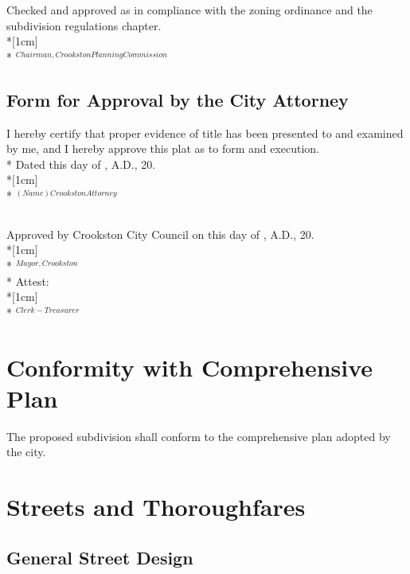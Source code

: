 \subsubsection{}
Checked and approved as in compliance with the zoning ordinance and the subdivision regulations chapter.\\*[1cm]
\fillable{5cm}\\*
$^{Chairman, Crookston Planning Commission}$
\subsection{Form for Approval by the City Attorney}
I hereby certify that proper evidence of title has been presented to and examined by me, and I hereby approve this plat as to form and execution.\\*
Dated this \fillable{1cm} day of \fillable{2cm}, A.D., 20\fillable{1cm}.\\*[1cm]
\fillable{5cm}\\*
$^{(Name) Crookston Attorney}$
\subsection{}
Approved by Crookston City Council on this \fillable{1cm} day of \fillable{2cm}, A.D., 20\fillable{1cm}.\\*[1cm]
\fillable{5cm}\\*
$^{Mayor, Crookston}$\\*
Attest:\\*[1cm]
\fillable{5cm}\\*
$^{Clerk-Treasurer}$


\setcounter{section}{29}
\section{Conformity with Comprehensive Plan}
The proposed subdivision shall conform to the comprehensive plan adopted by the city.

\section{Streets and Thoroughfares}
\subsection{General Street Design}
